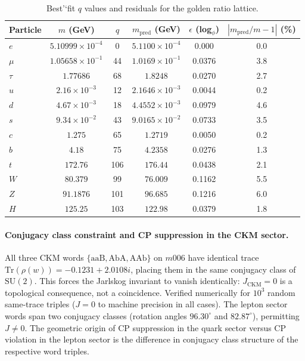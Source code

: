 \documentclass[12pt]{article}
\theoremstyle{definition}
\begin{document}
\begin{table}[htbp]
\centering
\caption{Best'`fit $q$ values and residuals for the golden ratio lattice.}
\label{tab:masses}
\begin{tabular}{lccccc}
\toprule
Particle & $m$ (GeV) & $q$ & $m_{\text{pred}}$ (GeV) & $\epsilon$ (log$_\phi$) & $|m_{\text{pred}}/m - 1|$ (\%) \\
\midrule
$e$     & $5.10999\times10^{-4}$ & 0    & $5.1100\times10^{-4}$ & 0.000 & 0.0\\
$\mu$   & $1.05658\times10^{-1}$ & 44   & $1.0169\times10^{-1}$ & 0.0376 & 3.8\\
$\tau$  & $1.77686$              & 68   & $1.8248$               & 0.0270 & 2.7\\
$u$     & $2.16\times10^{-3}$    & 12   & $2.1646\times10^{-3}$ & 0.0044 & 0.2\\
$d$     & $4.67\times10^{-3}$    & 18   & $4.4552\times10^{-3}$ & 0.0979 & 4.6\\
$s$     & $9.34\times10^{-2}$    & 43   & $9.0165\times10^{-2}$ & 0.0733 & 3.5\\
$c$     & $1.275$                & 65   & $1.2719$               & 0.0050 & 0.2\\
$b$     & $4.18$                 & 75   & $4.2358$               & 0.0276 & 1.3\\
$t$     & $172.76$               & 106  & $176.44$               & 0.0438 & 2.1\\
$W$     & $80.379$               & 99   & $76.009$               & 0.1162 & 5.5\\
$Z$     & $91.1876$              & 101  & $96.685$               & 0.1216 & 6.0\\
$H$     & $125.25$               & 103  & $122.98$               & 0.0379 & 1.8\\
\bottomrule
\end{tabular}
\end{table}


\paragraph{Conjugacy class constraint and CP suppression in the CKM sector.}
All three CKM words $\{\mathrm{aaB},\mathrm{AbA},\mathrm{AAb}\}$ on $m006$
have identical trace $\mathrm{Tr}(\rho(w))=-0.1231+2.0108i$,
placing them in the same conjugacy class of $\mathrm{SU}(2)$.
This forces the Jarlskog invariant to vanish identically: $J_{\mathrm{CKM}}=0$
is a topological consequence, not a coincidence.
Verified numerically for $10^3$ random same-trace triples ($J=0$ to
machine precision in all cases).
The lepton sector words span two conjugacy classes
(rotation angles $96.30^\circ$ and $82.87^\circ$), permitting $J\neq0$.
The geometric origin of CP suppression in the quark sector versus
CP violation in the lepton sector is the difference in conjugacy class
structure of the respective word triples.
\end{document}
